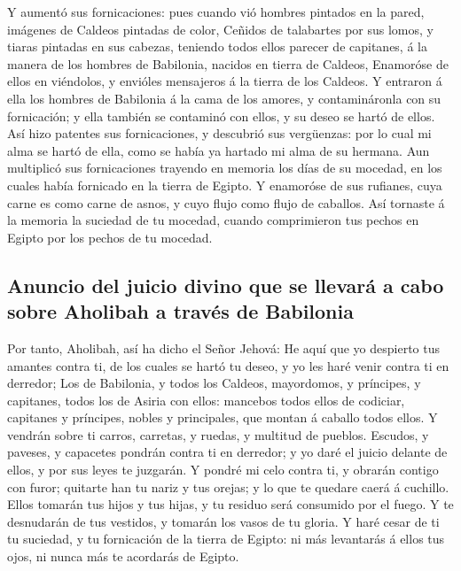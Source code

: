  Y aumentó sus fornicaciones: pues cuando vió hombres
pintados en la pared, imágenes de Caldeos pintadas de color,
 Ceñidos de talabartes por sus lomos, y tiaras pintadas
en sus cabezas, teniendo todos ellos parecer de capitanes, á la manera
de los hombres de Babilonia, nacidos en tierra de Caldeos,
 Enamoróse de ellos en viéndolos, y envióles mensajeros á
la tierra de los Caldeos.  Y entraron á ella los hombres
de Babilonia á la cama de los amores, y contamináronla con su
fornicación; y ella también se contaminó con ellos, y su deseo se hartó
de ellos.  Así hizo patentes sus fornicaciones, y
descubrió sus vergüenzas: por lo cual mi alma se hartó de ella, como se
había ya hartado mi alma de su hermana.  Aun multiplicó
sus fornicaciones trayendo en memoria los días de su mocedad, en los
cuales había fornicado en la tierra de Egipto.  Y
enamoróse de sus rufianes, cuya carne es como carne de asnos, y cuyo
flujo como flujo de caballos.  Así tornaste á la memoria
la suciedad de tu mocedad, cuando comprimieron tus pechos en Egipto por
los pechos de tu mocedad.

\hypertarget{anuncio-del-juicio-divino-que-se-llevaruxe1-a-cabo-sobre-aholibah-a-travuxe9s-de-babilonia}{%
\subsection{Anuncio del juicio divino que se llevará a cabo sobre
Aholibah a través de
Babilonia}\label{anuncio-del-juicio-divino-que-se-llevaruxe1-a-cabo-sobre-aholibah-a-travuxe9s-de-babilonia}}

 Por tanto, Aholibah, así ha dicho el Señor Jehová: He
aquí que yo despierto tus amantes contra ti, de los cuales se hartó tu
deseo, y yo les haré venir contra ti en derredor;  Los de
Babilonia, y todos los Caldeos, mayordomos, y príncipes, y capitanes,
todos los de Asiria con ellos: mancebos todos ellos de codiciar,
capitanes y príncipes, nobles y principales, que montan á caballo todos
ellos.  Y vendrán sobre ti carros, carretas, y ruedas, y
multitud de pueblos. Escudos, y paveses, y capacetes pondrán contra ti
en derredor; y yo daré el juicio delante de ellos, y por sus leyes te
juzgarán.  Y pondré mi celo contra ti, y obrarán contigo
con furor; quitarte han tu nariz y tus orejas; y lo que te quedare caerá
á cuchillo. Ellos tomarán tus hijos y tus hijas, y tu residuo será
consumido por el fuego.  Y te desnudarán de tus vestidos,
y tomarán los vasos de tu gloria.  Y haré cesar de ti tu
suciedad, y tu fornicación de la tierra de Egipto: ni más levantarás á
ellos tus ojos, ni nunca más te acordarás de Egipto.

